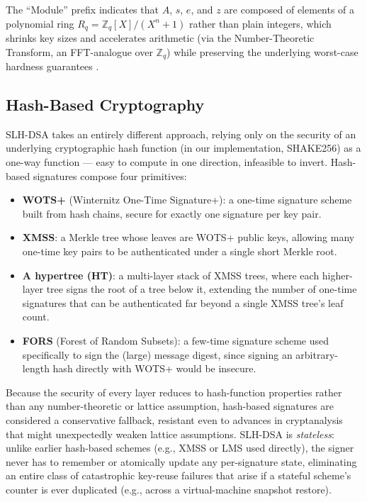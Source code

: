\documentclass[10pt,conference]{IEEEtran}
\begin{document}
The ``Module'' prefix indicates that $A$, $s$, $e$, and $z$ are composed
of elements of a polynomial ring $R_q = \mathbb{Z}_q[X]/(X^n+1)$ rather
than plain integers, which shrinks key sizes and accelerates arithmetic
(via the Number-Theoretic Transform, an FFT-analogue over $\mathbb{Z}_q$)
while preserving the underlying worst-case hardness guarantees
\cite{peikert}.

\subsection{Hash-Based Cryptography}

SLH-DSA takes an entirely different approach, relying only on the
security of an underlying cryptographic hash function (in our
implementation, SHAKE256) as a one-way function --- easy to compute in
one direction, infeasible to invert. Hash-based signatures compose four
primitives:

\begin{itemize}
\item \textbf{WOTS+} (Winternitz One-Time Signature+): a one-time
  signature scheme built from hash chains, secure for exactly one
  signature per key pair.
\item \textbf{XMSS}: a Merkle tree whose leaves are WOTS+ public keys,
  allowing many one-time key pairs to be authenticated under a single
  short Merkle root.
\item \textbf{A hypertree (HT)}: a multi-layer stack of XMSS trees, where
  each higher-layer tree signs the root of a tree below it, extending the
  number of one-time signatures that can be authenticated far beyond a
  single XMSS tree's leaf count.
\item \textbf{FORS} (Forest of Random Subsets): a few-time signature
  scheme used specifically to sign the (large) message digest, since
  signing an arbitrary-length hash directly with WOTS+ would be
  insecure.
\end{itemize}

Because the security of every layer reduces to hash-function properties
rather than any number-theoretic or lattice assumption, hash-based
signatures are considered a conservative fallback, resistant even to
advances in cryptanalysis that might unexpectedly weaken lattice
assumptions. SLH-DSA is \emph{stateless}: unlike earlier hash-based
schemes (e.g., XMSS or LMS used directly), the signer never has to
remember or atomically update any per-signature state, eliminating an
entire class of catastrophic key-reuse failures that arise if a stateful
scheme's counter is ever duplicated (e.g., across a virtual-machine
snapshot restore).
\end{document}
